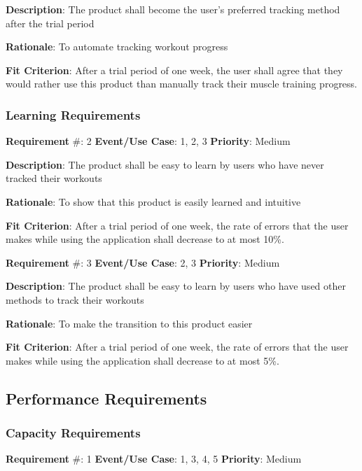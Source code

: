\documentclass{article}
\newcommand\tab{\hspace*{2cm}}
\begin{document}
\textbf{Description}: The product shall become the user’s preferred tracking method after the trial period

\textbf{Rationale}: To automate tracking workout progress

\textbf{Fit Criterion}: After a trial period of one week, the user shall agree that they would rather use this product than manually track their muscle training progress.

\medskip

\subsubsection{Learning Requirements}
\textbf{Requirement} \#: 2 \tab \textbf{Event/Use Case}: 1, 2, 3 \tab \textbf{Priority}: Medium

\textbf{Description}: The product shall be easy to learn by users who have never tracked their workouts

\textbf{Rationale}: To show that this product is easily learned and intuitive

\textbf{Fit Criterion}: After a trial period of one week, the rate of errors that the user makes while using the application shall decrease to at most 10\%.

\medskip

\textbf{Requirement} \#: 3 \tab \textbf{Event/Use Case}: 2, 3 \tab \textbf{Priority}: Medium

\textbf{Description}: The product shall be easy to learn by users who have used other methods to track their workouts

\textbf{Rationale}: To make the transition to this product easier

\textbf{Fit Criterion}: After a trial period of one week, the rate of errors that the user makes while using the application shall decrease to at most 5\%.

\medskip

\subsection{Performance Requirements}

\subsubsection{Capacity Requirements}

\textbf{Requirement} \#: 1 \tab \textbf{Event/Use Case}: 1, 3, 4, 5 \tab \textbf{Priority}: Medium
\end{document}
